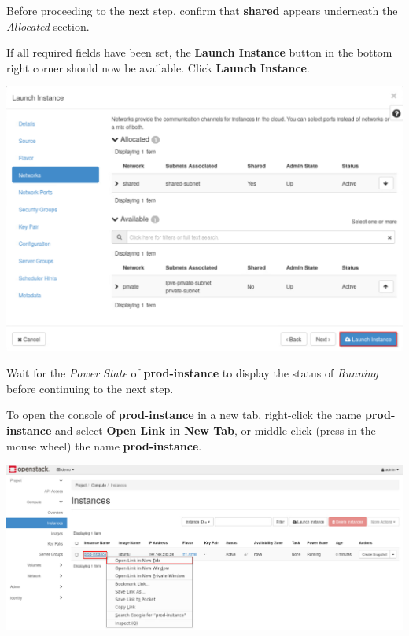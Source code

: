 \documentclass[letterpaper, 12pt]{article}
\begin{document}
\begin{enumerate}
    \begin{stopbox}
        Before proceeding to the next step, confirm that \textbf{shared} appears underneath the \textit{Allocated} section.
    \end{stopbox}

    \begin{labstep}
        If all required fields have been set, the \textbf{Launch Instance} button in the bottom right corner should now be available.
        Click \textbf{Launch Instance}.

        \begin{center}
            \includegraphics[width=\linewidth]{images/part1/step10.png}
        \end{center}
    \end{labstep}

    \begin{stopbox}
        Wait for the \textit{Power State} of \textbf{prod-instance} to display the status of \textit{Running} before continuing to the next step.
    \end{stopbox}

    \begin{labstep}
        To open the console of \textbf{prod-instance} in a new tab, right-click the name \textbf{prod-instance} and select \textbf{Open Link in New Tab}, or middle-click (press in the mouse wheel) the name \textbf{prod-instance}.

        \begin{center}
            \includegraphics[width=\linewidth]{images/part1/step11.png}
        \end{center}
    \end{labstep}


\end{enumerate}
\end{document}

